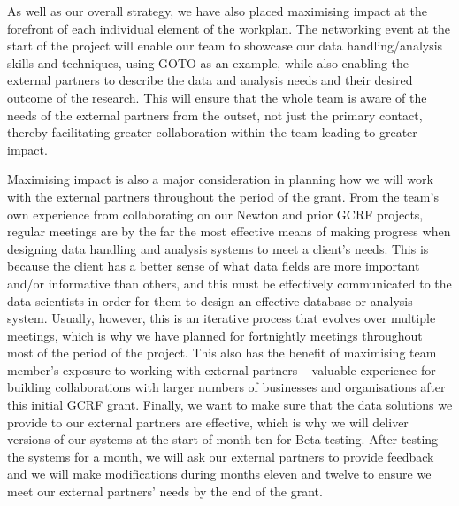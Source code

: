 \documentclass[11pt]{article}
\begin{document}
  \vspace{2mm}
  \noindent
  As well as our overall strategy, we have also placed maximising impact at the forefront of each individual element of the workplan. The networking event at the start of the project will enable our team to showcase our data handling/analysis skills and techniques, using GOTO as an example, while also enabling the external partners to describe the data and analysis needs and their desired outcome of the research. This will ensure that the whole team is aware of the needs of the external partners from the outset, not just the primary contact, thereby facilitating greater collaboration within the team leading to greater impact.
  
  \vspace{2mm}
  \noindent
  Maximising impact is also a major consideration in planning how we will work with the external partners throughout the period of the grant. From the team's own experience from collaborating on our Newton and prior GCRF projects, regular meetings are by the far the most effective means of making progress when designing data handling and analysis systems to meet a client's needs. This is because the client has a better sense of what data fields are more important and/or informative than others, and this must be effectively communicated to the data scientists in order for them to design an effective database or analysis system. Usually, however, this is an iterative process that evolves over multiple meetings, which is why we have planned for fortnightly meetings throughout most of the period of the project. This also has the benefit of maximising team member's exposure to working with external partners -- valuable experience for building collaborations with larger numbers of businesses and organisations after this initial GCRF grant. Finally, we want to make sure that the data solutions we provide to our external partners are effective, which is why we will deliver versions of our systems at the start of month ten for Beta testing. After testing the systems for a month, we will ask our external partners to provide feedback and we will make modifications during months eleven and twelve to ensure we meet our external partners' needs by the end of the grant. 
  
\end{document}
